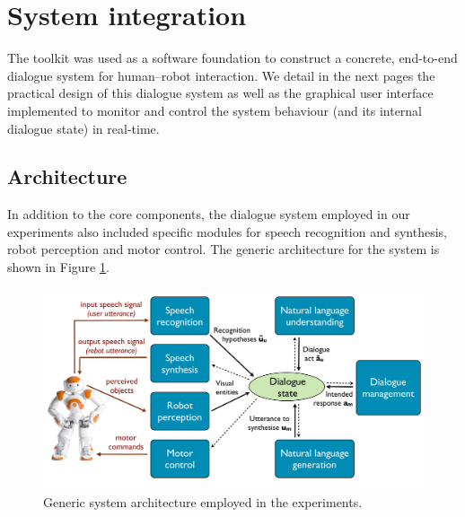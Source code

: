 
\section{System integration}
\label{sec:system-integration}
The \opendial{} toolkit was used as a software foundation to construct a concrete, end-to-end dialogue system for human--robot interaction.  We detail in the next pages the practical design of this dialogue system as well as the graphical user interface implemented to monitor and control the system behaviour (and its internal dialogue state) in real-time. 
\subsection{Architecture}

In addition to the \opendial{} core components, the dialogue system employed in our experiments also included specific modules for speech recognition and synthesis, robot perception and motor control.  The generic architecture for the system is shown in Figure \ref{fig:impl_architecture}. 

\begin{figure}[ht]
\centering
\includegraphics[scale=0.30]{imgs/impl_architecture.pdf}
\caption{Generic system architecture employed in the experiments.}
\label{fig:impl_architecture}
\end{figure}

